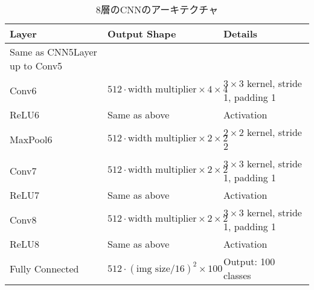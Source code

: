 \begin{table}[h]
    \centering
    \caption{8層のCNNのアーキテクチャ}
    \label{tab:cnn8layer}
    \begin{tabular}{lll}
    \toprule
    \textbf{Layer} & \textbf{Output Shape} & \textbf{Details} \\
    \midrule
    Same as CNN5Layer up to Conv5 & & \\
    Conv6 & $512 \cdot \text{width multiplier} \times 4 \times 4$ & $3 \times 3$ kernel, stride 1, padding 1 \\
    ReLU6 & Same as above & Activation \\
    MaxPool6 & $512 \cdot \text{width multiplier} \times 2 \times 2$ & $2 \times 2$ kernel, stride 2 \\
    Conv7 & $512 \cdot \text{width multiplier} \times 2 \times 2$ & $3 \times 3$ kernel, stride 1, padding 1 \\
    ReLU7 & Same as above & Activation \\
    Conv8 & $512 \cdot \text{width multiplier} \times 2 \times 2$ & $3 \times 3$ kernel, stride 1, padding 1 \\
    ReLU8 & Same as above & Activation \\
    Fully Connected & $512 \cdot (\text{img size}/16)^2 \times 100$ & Output: 100 classes \\
    \bottomrule
    \end{tabular}
\end{table}

